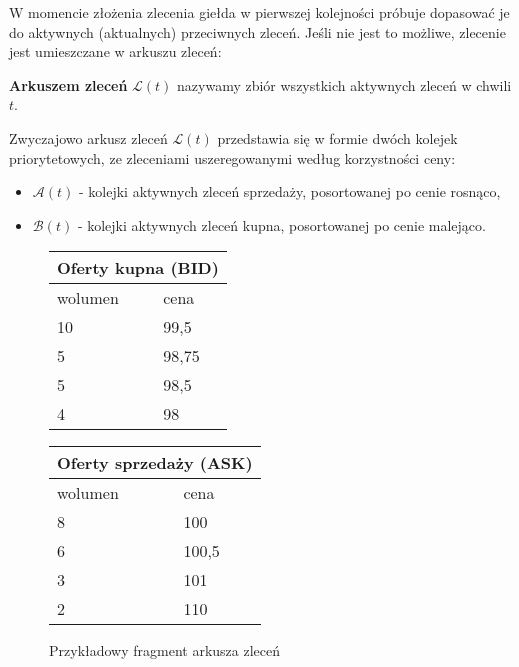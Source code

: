 W momencie złożenia zlecenia giełda w pierwszej kolejności próbuje dopasować je do aktywnych (aktualnych) przeciwnych zleceń. Jeśli nie jest to możliwe, zlecenie jest umieszczane w arkuszu zleceń: 
\begin{definition}
\textbf{Arkuszem zleceń} $\mathcal{L}(t)$ nazywamy zbiór wszystkich aktywnych zleceń w chwili $t$.
\end{definition}

Zwyczajowo arkusz zleceń $\mathcal{L}(t)$ przedstawia się w formie dwóch kolejek priorytetowych, ze zleceniami uszeregowanymi według korzystności ceny: 
\begin{itemize}
\item $\mathcal{A}(t)$ - kolejki aktywnych zleceń sprzedaży, posortowanej po cenie rosnąco,
\item $\mathcal{B}(t)$ - kolejki aktywnych zleceń kupna, posortowanej po cenie malejąco.
\end{itemize}

\begin{figure}[ht]
\begin{center}
\parbox{.3\linewidth}{
\begin{tabular}{ |l|l| }
\hline
\multicolumn{2}{|c|}{Oferty kupna (BID)} \\
\hline
 \rowcolor{palegreen} wolumen & cena \\
\hline
 \rowcolor{palegreen} 10 & 99,5 \\
 \hline
  \rowcolor{palegreen} 5 & 98,75 \\
\hline
  \rowcolor{palegreen} 5 & 98,5 \\
\hline
  \rowcolor{palegreen} 4 & 98 \\
\hline
\end{tabular}}
\parbox{.3\linewidth}{
\begin{tabular}{ |l|l| }
\hline
 \multicolumn{2}{|c|}{Oferty sprzedaży (ASK)} \\
\hline
 \rowcolor{palered} wolumen & cena \\
\hline
 \rowcolor{palered} 8 & 100 \\
 \hline
  \rowcolor{palered} 6 & 100,5 \\
\hline
  \rowcolor{palered} 3 & 101 \\
\hline
  \rowcolor{palered} 2 & 110 \\
\hline
\end{tabular}
}
\end{center}
\caption{{Przykładowy fragment arkusza zleceń}} \label{fig:orderbook_1}
\end{figure}

